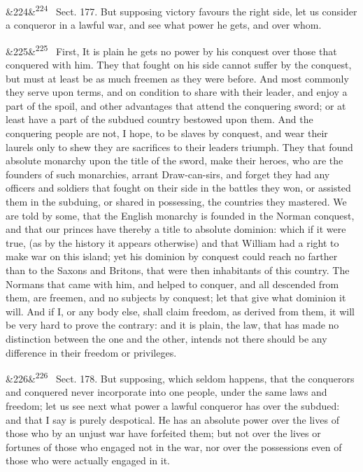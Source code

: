 \documentclass[12pt]{article}
\newcommand{\para}[1][]{\par\noindent\ifx&#1&\else\textsuperscript{\footnotesize #1}~\fi}
\begin{document}
\para[224] Sect. 177. But supposing victory favours the right side, let us consider a conqueror in a lawful war, and see what power he gets, and over whom.

\para[225] First, It is plain he gets no power by his conquest over those that conquered with him. They that fought on his side cannot suffer by the conquest, but must at least be as much freemen as they were before. And most commonly they serve upon terms, and on condition to share with their leader, and enjoy a part of the spoil, and other advantages that attend the conquering sword; or at least have a part of the subdued country bestowed upon them. And the conquering people are not, I hope, to be slaves by conquest, and wear their laurels only to shew they are sacrifices to their leaders triumph. They that found absolute monarchy upon the title of the sword, make their heroes, who are the founders of such monarchies, arrant Draw-can-sirs, and forget they had any officers and soldiers that fought on their side in the battles they won, or assisted them in the subduing, or shared in possessing, the countries they mastered. We are told by some, that the English monarchy is founded in the Norman conquest, and that our princes have thereby a title to absolute dominion: which if it were true, (as by the history it appears otherwise) and that William had a right to make war on this island; yet his dominion by conquest could reach no farther than to the Saxons and Britons, that were then inhabitants of this country. The Normans that came with him, and helped to conquer, and all descended from them, are freemen, and no subjects by conquest; let that give what dominion it will. And if I, or any body else, shall claim freedom, as derived from them, it will be very hard to prove the contrary: and it is plain, the law, that has made no distinction between the one and the other, intends not there should be any difference in their freedom or privileges.

\para[226] Sect. 178. But supposing, which seldom happens, that the conquerors and conquered never incorporate into one people, under the same laws and freedom; let us see next what power a lawful conqueror has over the subdued: and that I say is purely despotical. He has an absolute power over the lives of those who by an unjust war have forfeited them; but not over the lives or fortunes of those who engaged not in the war, nor over the possessions even of those who were actually engaged in it.
\end{document}
